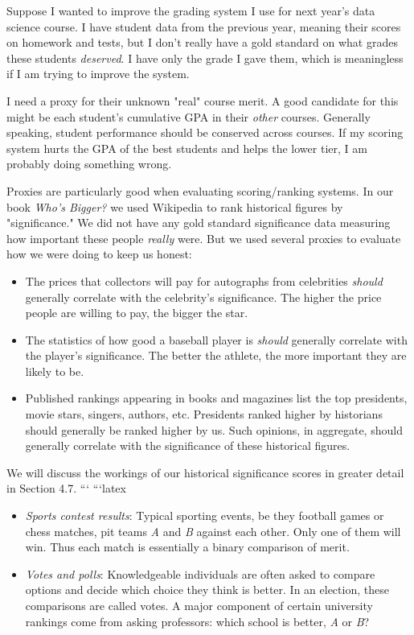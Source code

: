 \documentclass[10pt]{article}
\begin{document}
Suppose I wanted to improve the grading system I use for next year's data science course. I have student data from the previous year, meaning their scores on homework and tests, but I don't really have a gold standard on what grades these students \textit{deserved}. I have only the grade I gave them, which is meaningless if I am trying to improve the system.

I need a proxy for their unknown "real" course merit. A good candidate for this might be each student's cumulative GPA in their \textit{other} courses. Generally speaking, student performance should be conserved across courses. If my scoring system hurts the GPA of the best students and helps the lower tier, I am probably doing something wrong.

Proxies are particularly good when evaluating scoring/ranking systems. In our book \textit{Who's Bigger?} \cite{SW13} we used Wikipedia to rank historical figures by "significance." We did not have any gold standard significance data measuring how important these people \textit{really} were. But we used several proxies to evaluate how we were doing to keep us honest:
\begin{itemize}
  \item The prices that collectors will pay for autographs from celebrities \textit{should} generally correlate with the celebrity's significance. The higher the price people are willing to pay, the bigger the star.
  \item The statistics of how good a baseball player is \textit{should} generally correlate with the player's significance. The better the athlete, the more important they are likely to be.
  \item Published rankings appearing in books and magazines list the top presidents, movie stars, singers, authors, etc. Presidents ranked higher by historians should generally be ranked higher by us. Such opinions, in aggregate, should generally correlate with the significance of these historical figures.
\end{itemize}
We will discuss the workings of our historical significance scores in greater detail in Section 4.7.
```
```latex
\begin{itemize}
    \item \textit{Sports contest results}: Typical sporting events, be they football games or chess matches, pit teams \textit{A} and \textit{B} against each other. Only one of them will win. Thus each match is essentially a binary comparison of merit.
    \item \textit{Votes and polls}: Knowledgeable individuals are often asked to compare options and decide which choice they think is better. In an election, these comparisons are called votes. A major component of certain university rankings come from asking professors: which school is better, \textit{A} or \textit{B}?
\end{itemize}
\end{document}
